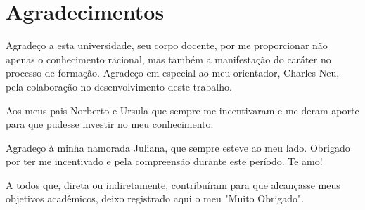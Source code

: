 
\chapter*{Agradecimentos}

Agradeço a esta universidade, seu corpo docente, por me proporcionar não apenas o conhecimento racional, mas também a manifestação do caráter no processo de formação. Agradeço em especial ao meu orientador, Charles Neu, pela colaboração no desenvolvimento deste trabalho.

Aos meus pais Norberto e Ursula que sempre me incentivaram e me deram aporte para que pudesse investir no meu conhecimento.

Agradeço à minha namorada Juliana, que sempre esteve ao meu lado. Obrigado por ter me incentivado e pela compreensão durante este período. Te amo!

A todos que, direta ou indiretamente, contribuíram para que alcançasse meus objetivos acadêmicos, deixo registrado aqui o meu "Muito Obrigado".